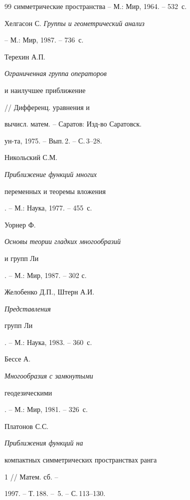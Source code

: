 \begin{thebibliography}{99}
{симметрические пространства} -- М.: Мир, 1964. -- 532~с.







Хелгасон С. {\it Группы и геометрический анализ}


-- М.: Мир, 1987. -- 736~с.







Терехин А.П. {\it Ограниченная группа операторов


и наилучшее приближение} // Дифференц. уравнения и


вычисл. матем. -- Саратов: Изд-во Саратовск.


ун-та, 1975. -- Вып.\,2. -- С.\,3--28.







Никольский С.М. {\it Приближение функций многих


переменных и теоремы вложения}. -- М.: Наука, 1977. -- 455~с.







Уорнер Ф. {\it Основы теории гладких многообразий


и групп Ли}. -- М.: Мир, 1987. -- 302 с.







Желобенко Д.П., Штерн А.И. {\it Представления


групп Ли}. -- М.: Наука, 1983. -- 360~с.







Бессе А. {\it Многообразия с замкнутыми


геодезическими}. -- М.: Мир, 1981. -- 326~с.







Платонов С.С. {\it Приближения функций на


компактных симметрических пространствах ранга} 1 // Матем. сб. --


1997. -- Т.\,188. -- \No\,5. -- С.\,113--130.





\end{thebibliography}





\vskip 2cm











\label{end}








